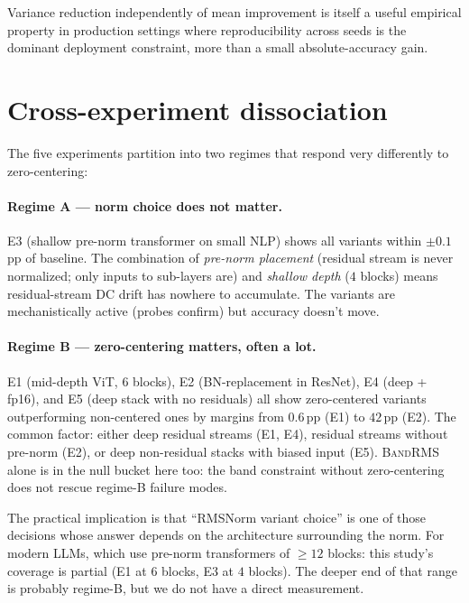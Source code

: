 \documentclass{article}
\newcommand{\bandrms}{\textsc{BandRMS}}
\begin{document}
Variance reduction independently of mean improvement is itself a useful empirical property in production settings where reproducibility across seeds is the dominant deployment constraint, more than a small absolute-accuracy gain.

\section{Cross-experiment dissociation}
\label{sec:dissociation}

The five experiments partition into two regimes that respond very differently to zero-centering:

\paragraph{Regime A --- norm choice does not matter.}
E3 (shallow pre-norm transformer on small NLP) shows all variants within $\pm 0.1$\,pp of baseline.
The combination of \emph{pre-norm placement} (residual stream is never normalized; only inputs to sub-layers are) and \emph{shallow depth} ($4$ blocks) means residual-stream DC drift has nowhere to accumulate.
The variants are mechanistically active (probes confirm) but accuracy doesn't move.

\paragraph{Regime B --- zero-centering matters, often a lot.}
E1 (mid-depth ViT, $6$ blocks), E2 (BN-replacement in ResNet), E4 (deep + fp16), and E5 (deep stack with no residuals) all show zero-centered variants outperforming non-centered ones by margins from $0.6$\,pp (E1) to $42$\,pp (E2).
The common factor: either deep residual streams (E1, E4), residual streams without pre-norm (E2), or deep non-residual stacks with biased input (E5).
\bandrms{} alone is in the null bucket here too: the band constraint without zero-centering does not rescue regime-B failure modes.

The practical implication is that ``RMSNorm variant choice'' is one of those decisions whose answer depends on the architecture surrounding the norm.
For modern LLMs, which use pre-norm transformers of $\geq 12$ blocks: this study's coverage is partial (E1 at $6$ blocks, E3 at $4$ blocks).
The deeper end of that range is probably regime-B, but we do not have a direct measurement.
\end{document}
